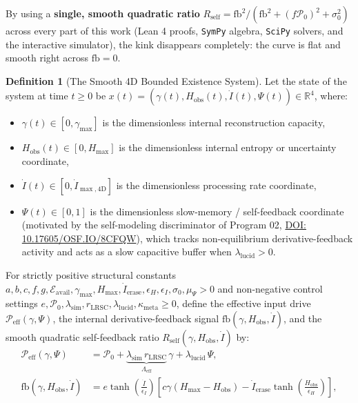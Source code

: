 \documentclass[11pt,a4paper]{article}
\theoremstyle{definition}
\newtheorem{definition}[theorem]{Definition}
\begin{document}
By using a \textbf{single, smooth quadratic ratio} $R_{\mathrm{self}} = \mathrm{fb}^2 / (\mathrm{fb}^2 + (f\mathcal{P}_0)^2 + \sigma_0^2)$ across every part of this work (Lean 4 proofs, \texttt{SymPy} algebra, \texttt{SciPy} solvers, and the interactive simulator), the kink disappears completely: the curve is flat and smooth right across $\mathrm{fb} = 0$.

\begin{definition}[The Smooth 4D Bounded Existence System]
\label{def:system4d}
Let the state of the system at time $t \ge 0$ be $x(t) = (\gamma(t), H_{\mathrm{obs}}(t), \dot{I}(t), \Psi(t)) \in \mathbb{R}^4$, where:
\begin{itemize}
  \item $\gamma(t) \in [0, \gamma_{\max}]$ is the dimensionless internal reconstruction capacity,
  \item $H_{\mathrm{obs}}(t) \in [0, H_{\max}]$ is the dimensionless internal entropy or uncertainty coordinate,
  \item $\dot{I}(t) \in [0, \dot{I}_{\max,4\mathrm{D}}]$ is the dimensionless processing rate coordinate,
  \item $\Psi(t) \in [0, 1]$ is the dimensionless slow-memory / self-feedback coordinate (motivated by the self-modeling discriminator of Program 02, \href{https://doi.org/10.17605/OSF.IO/8CFQW}{DOI: 10.17605/OSF.IO/8CFQW}), which tracks non-equilibrium derivative-feedback activity and acts as a slow capacitive buffer when $\lambda_{\mathrm{lucid}} > 0$.
\end{itemize}
For strictly positive structural constants $a, b, c, f, g, \mathcal{E}_{\mathrm{avail}}, \gamma_{\max}, H_{\max}, \dot{I}_{\mathrm{erase}}, \epsilon_H, \epsilon_I, \sigma_0, \mu_\Psi > 0$ and non-negative control settings $e, \mathcal{P}_0, \lambda_{\mathrm{sim}}, r_{\mathrm{LRSC}}, \lambda_{\mathrm{lucid}}, \kappa_{\mathrm{meta}} \ge 0$, define the effective input drive $\mathcal{P}_{\mathrm{eff}}(\gamma, \Psi)$, the internal derivative-feedback signal $\mathrm{fb}(\gamma, H_{\mathrm{obs}}, \dot{I})$, and the smooth quadratic self-feedback ratio $R_{\mathrm{self}}(\gamma, H_{\mathrm{obs}}, \dot{I})$ by:
\begin{align}
\label{eq:Peff}
\mathcal{P}_{\mathrm{eff}}(\gamma, \Psi) &= \mathcal{P}_0 + \underbrace{\lambda_{\mathrm{sim}}\,r_{\mathrm{LRSC}}}_{\Lambda_{\mathrm{eff}}}\,\gamma + \lambda_{\mathrm{lucid}}\,\Psi, \\
\label{eq:fb}
\mathrm{fb}(\gamma, H_{\mathrm{obs}}, \dot{I}) &= e\tanh\!\left(\frac{\dot{I}}{\epsilon_I}\right)\!\left[c\gamma(H_{\max} - H_{\mathrm{obs}}) - \dot{I}_{\mathrm{erase}}\tanh\!\left(\frac{H_{\mathrm{obs}}}{\epsilon_H}\right)\right], \\

\end{align}
\end{definition}
\end{document}
